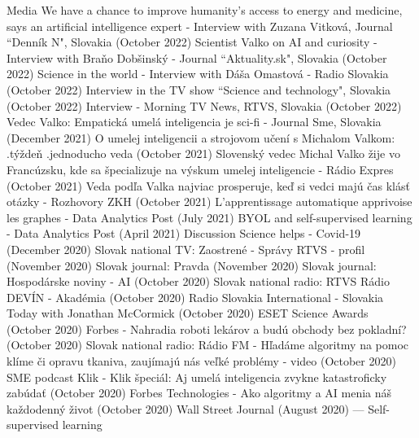 \documentclass{resume}
\begin{document}
\begin{category}{Media}
\citembullet
We have a chance to improve humanity's access to energy and medicine, says an artificial intelligence expert - Interview with Zuzana Vitkov\' a, Journal ``Denn\'ik N", Slovakia  ({\sf October 2022})
\citembullet
Scientist Valko on AI and curiosity - Interview with Bra\v no Dob\v sinsk\' y - Journal ``Aktuality.sk", Slovakia ({\sf October 2022})
\citembullet
Science in the world - Interview with D\' a\v sa Omastov\' a  - Radio Slovakia ({\sf October 2022})
\citembullet
Interview in the TV show ``Science and technology", Slovakia ({\sf October 2022})
\citembullet
Interview - Morning TV News, RTVS, Slovakia ({\sf October 2022})
\citembullet
Vedec Valko: Empatick\' a umel\' a inteligencia je sci-fi - Journal Sme, Slovakia ({\sf December 2021})
\citembullet
O umelej inteligencii a strojovom učen\' i s Michalom Valkom: .t\' y\v zde\v n .jednoducho veda ({\sf October 2021})
\citembullet
Slovenský vedec Michal Valko \v zije vo Francúzsku, kde sa \v specializuje na v\' yskum umelej inteligencie - R\' adio Expres ({\sf October 2021})
\citembullet
Veda podľa Valka najviac prosperuje, ke\v d si vedci maj\' u  \v cas kl\' as\v t ot\' azky - Rozhovory ZKH ({\sf October 2021})
\citembullet
L’apprentissage automatique apprivoise les graphes - Data Analytics Post ({\sf July 2021})
\citembullet
BYOL and self-supervised learning - Data Analytics Post ({\sf April 2021})
\citembullet
Discussion Science helps - Covid-19 ({\sf December 2020})
\citembullet
Slovak national TV: Zaostren\' e - Správy RTVS - profil  ({\sf November 2020})
\citembullet
Slovak journal: Pravda ({\sf November 2020})
\citembullet
Slovak journal: Hospod\'arske noviny - AI ({\sf  October 2020})
\citembullet
Slovak national radio: RTVS R\'adio DEV\'IN - Akad\'emia ({\sf  October 2020})
\citembullet
Radio Slovakia International - Slovakia Today with Jonathan McCormick ({\sf  October 2020})
\citembullet
ESET Science Awards ({\sf  October 2020}) 
\citembullet
Forbes - Nahradia roboti lek\'arov a bud\'u obchody bez pokladn\'i?({\sf  October 2020})
\citembullet
Slovak national radio: Rádio FM - Hľadáme algoritmy na pomoc klíme či opravu tkaniva, zaujímajú nás veľké problémy - video ({\sf  October 2020})
\citembullet
SME podcast Klik - Klik špeciál: Aj umel\'a inteligencia zvykne katastroficky zab\'uda\v{t} ({\sf  October 2020})
\citembullet
Forbes Technologies - Ako algoritmy a AI menia n\'a\v{s}  ka\v{z}dodenný \v{z}ivot ({\sf  October 2020})
\citembullet
Wall Street Journal ({\sf  August 2020}) --- Self-supervised learning
\citembullet

\end{category}
\end{document}
